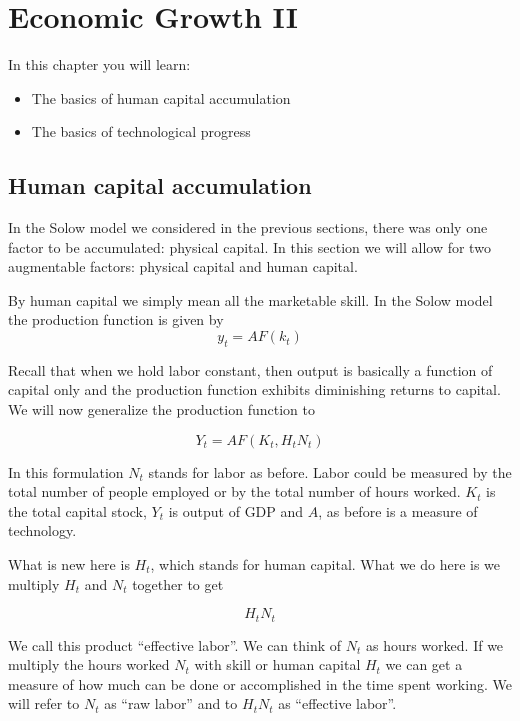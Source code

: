 \documentclass[
]{book}
\providecommand{\tightlist}{%
  \setlength{\itemsep}{0pt}\setlength{\parskip}{0pt}}
\begin{document}
\hypertarget{growth2}{%
\chapter{Economic Growth II}\label{growth2}}

In this chapter you will learn:

\begin{itemize}
\tightlist
\item
  The basics of human capital accumulation
\item
  The basics of technological progress
\end{itemize}

\hypertarget{human-capital-accumulation}{%
\section{Human capital accumulation}\label{human-capital-accumulation}}

In the Solow model we considered in the previous sections, there was only one factor to be accumulated: physical capital. In this section we will allow for two augmentable factors: physical capital and human capital.

By human capital we simply mean all the marketable skill. In the Solow model the production function is given by
\[y_t=A F(k_t)\]

Recall that when we hold labor constant, then output is basically a function of capital only and the production function exhibits diminishing returns to capital.
We will now generalize the production function to

\[Y_t = A F (K_t, H_tN_t)\]

In this formulation \(N_t\) stands for labor as before. Labor could be measured by the total number of people employed or by the total number of hours worked. \(K_t\) is the total capital stock, \(Y_t\) is output of GDP and \(A\), as before is a measure of technology.

What is new here is \(H_t\), which stands for human capital. What we do here is we multiply \(H_t\) and \(N_t\) together to get

\[H_tN_t\]

We call this product ``effective labor''. We can think of \(N_t\) as hours worked. If we multiply the hours worked \(N_t\) with skill or human capital \(H_t\) we can get a measure of how much can be done or accomplished in the time spent working. We will refer to \(N_t\) as ``raw labor'' and to \(H_tN_t\) as ``effective labor''.
\end{document}
